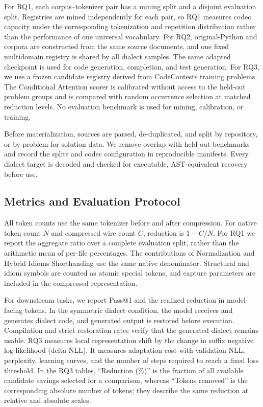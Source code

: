 For RQ1, each corpus--tokenizer pair has a mining split and a disjoint evaluation split. Registries are mined independently for each pair, so RQ1 measures codec capacity under the corresponding tokenization and repetition distribution rather than the performance of one universal vocabulary. For RQ2, original-Python and \tool corpora are constructed from the same source documents, and one fixed multidomain registry is shared by all dialect samples. The same adapted checkpoint is used for code generation, completion, and test generation. For RQ3, we use a frozen candidate registry derived from CodeContests training problems. The Conditional Attention scorer is calibrated without access to the held-out problem groups and is compared with random occurrence selection at matched reduction levels. No evaluation benchmark is used for mining, calibration, or training.

Before materialization, sources are parsed, de-duplicated, and split by repository, or by problem for solution data. We remove overlap with held-out benchmarks and record the splits and codec configuration in reproducible manifests. Every dialect target is decoded and checked for executable, AST-equivalent recovery before use.

\subsection{Metrics and Evaluation Protocol}
\label{subsec:metrics}

All token counts use the same tokenizer before and after compression. For native token count $N$ and compressed wire count $C$, reduction is $1-C/N$. For RQ1 we report the aggregate ratio over a complete evaluation split, rather than the arithmetic mean of per-file percentages. The contributions of Normalization and Hybrid Idioms Shorthanding use the same native denominator. Structural and idiom symbols are counted as atomic special tokens, and capture parameters are included in the compressed representation.

For downstream tasks, we report Pass@1 and the realized reduction in model-facing tokens. In the symmetric dialect condition, the model receives and generates dialect code, and generated output is restored before execution. Compilation and strict restoration rates verify that the generated dialect remains usable. RQ3 measures local representation shift by the change in suffix negative log-likelihood (delta-NLL). It measures adaptation cost with validation NLL, perplexity, learning curves, and the number of steps required to reach a fixed loss threshold. In the RQ3 tables, ``Reduction (\%)'' is the fraction of all available candidate savings selected for a comparison, whereas ``Tokens removed'' is the corresponding absolute number of tokens; they describe the same reduction at relative and absolute scales.

